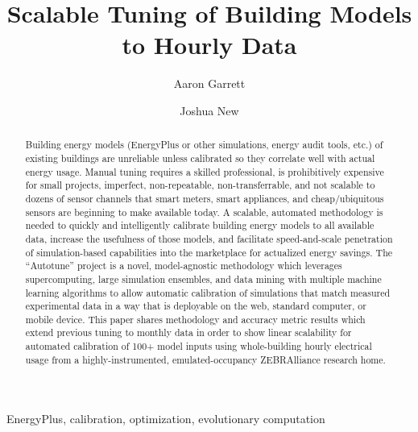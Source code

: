 \documentclass[preprint, review, 12pt]{elsarticle}
\begin{document}
\begin{frontmatter}

\title{Scalable Tuning of Building Models to Hourly Data}

\author[atr:garrett]{Aaron Garrett}
\author[atr:new]{Joshua New}

\address[atr:garrett]{Mathematical, Computing, and Information Sciences, Jacksonville State University, Jacksonville, AL, USA}
\address[atr:new]{Oak Ridge National Laboratory, Oak Ridge, TN, USA}


\begin{abstract}
Building energy models (EnergyPlus or other simulations, energy audit tools, etc.) of existing buildings are unreliable unless calibrated so they correlate well with actual energy usage. Manual tuning requires a skilled professional, is prohibitively expensive for small projects, imperfect, non-repeatable, non-transferrable, and not scalable to dozens of sensor channels that smart meters, smart appliances, and cheap/ubiquitous sensors are beginning to make available today. A scalable, automated methodology is needed to quickly and intelligently calibrate building energy models to all available data, increase the usefulness of those models, and facilitate speed-and-scale penetration of simulation-based capabilities into the marketplace for actualized energy savings. The ``Autotune'' project is a novel, model-agnostic methodology which leverages supercomputing, large simulation ensembles, and data mining with multiple machine learning algorithms to allow automatic calibration of simulations that match measured experimental data in a way that is deployable on the web, standard computer, or mobile device. This paper shares methodology and accuracy metric results which extend previous tuning to monthly data in order to show linear scalability for automated calibration of 100+ model inputs using whole-building hourly electrical usage from a highly-instrumented, emulated-occupancy ZEBRAlliance research home.
\end{abstract}

\begin{keyword}
EnergyPlus, calibration, optimization, evolutionary computation
\end{keyword}

\end{frontmatter}

\end{document}
